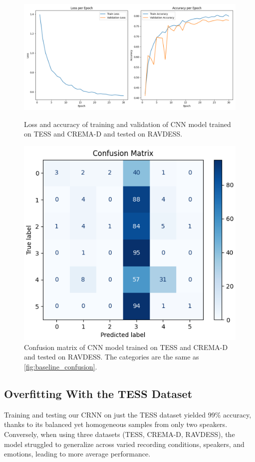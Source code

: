 \documentclass[../main.tex]{subfiles}
\begin{document}
\begin{figure}[ht]
    \centering
    \begin{minipage}{.5\textwidth}
      \centering
      \includegraphics[width=1.0\linewidth]{../resources/cnn_unmixed.png}
      \caption{Loss and accuracy of training and validation of CNN model trained on 
      TESS and CREMA-D and tested on RAVDESS.}
      \label{fig:cnn_unmixed}
    \end{minipage}%
    \hfill
    \begin{minipage}{.4\textwidth}
      \centering
      \includegraphics[width=.8\linewidth]{../resources/cnn_unmixed_confusion.png}
      \caption{Confusion matrix of CNN model trained on TESS and CREMA-D 
      and tested on RAVDESS. The categories are the same as 
      \autoref{fig:baseline_confusion}.} 
      \label{fig:cnn_unmixed_confusion}
    \end{minipage}
\end{figure}

\subsection{Overfitting With the TESS Dataset}

Training and testing our CRNN on just the TESS dataset yielded 99\% accuracy, 
thanks to its balanced yet homogeneous samples from only two speakers. Conversely, 
when using three datasets (TESS, CREMA-D, RAVDESS), the model struggled to 
generalize across varied recording conditions, speakers, and emotions, leading 
to more average performance.
\end{document}
